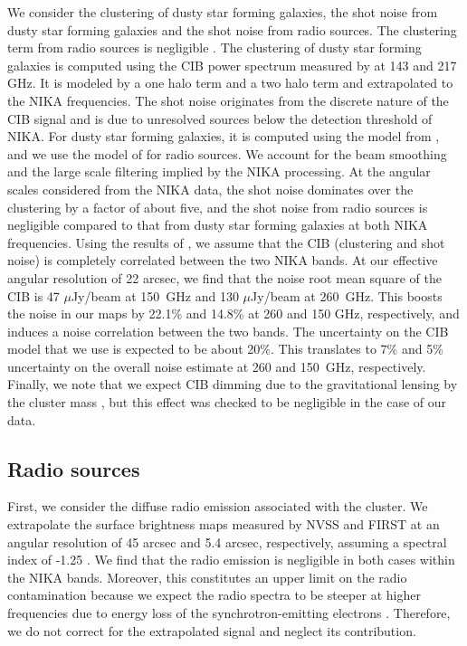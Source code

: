 \documentclass[twocolumn,traditabstract]{aa}
\begin{document}
We consider the clustering of dusty star forming galaxies, the shot noise from dusty star forming galaxies and the shot noise from radio sources. The clustering term from radio sources is negligible \citep{Hall2010}. The clustering of dusty star forming galaxies is computed using the CIB power spectrum measured by \cite{Planck2014XXX} at 143 and 217 GHz. It is modeled by a one halo term and a two halo term and extrapolated to the NIKA frequencies. The shot noise originates from the discrete nature of the CIB signal and is due to unresolved sources below the detection threshold of NIKA. For dusty star forming galaxies, it is computed using the model from \cite{Bethermin2012}, and we use the model of \cite{Tucci2011} for radio sources. We account for the beam smoothing and the large scale filtering implied by the NIKA processing. At the angular scales considered from the NIKA data, the shot noise dominates over the clustering by a factor of about five, and the shot noise from radio sources is negligible compared to that from dusty star forming galaxies at both NIKA frequencies. Using the results of \cite{Bethermin2013}, we assume that the CIB (clustering and shot noise) is completely correlated between the two NIKA bands. At our effective angular resolution of 22 arcsec, we find that the noise root mean square of the CIB is 47 $\mu$Jy/beam at 150~GHz and 130 $\mu$Jy/beam at 260~GHz. This boosts the noise in our maps by 22.1\% and 14.8\% at 260 and 150 GHz, respectively, and induces a noise correlation between the two bands. The uncertainty on the CIB model that we use is expected to be about 20\%. This translates to 7\% and 5\% uncertainty on the overall noise estimate at 260 and 150~GHz, respectively. Finally, we note that we expect CIB dimming due to the gravitational lensing by the cluster mass \citep{Zemcov2013}, but this effect was checked to be negligible in the case of our data.

\subsection{Radio sources}\label{sec:Radio_sources}
First, we consider the diffuse radio emission associated with the cluster. We extrapolate the surface brightness maps measured by NVSS \citep[NRAO VLA Sky Survey,][]{Condon1998} and FIRST \citep[Faint Images of the Radio Sky at Twenty Centimeters,][]{Becker1995} at an angular resolution of 45 arcsec and 5.4 arcsec, respectively, assuming a spectral index of -1.25 \citep{vanWeeren2009,Bonafede2009}. We find that the radio emission is negligible in both cases within the NIKA bands. Moreover, this constitutes an upper limit on the radio contamination because we expect the radio spectra to be steeper at higher frequencies due to energy loss of the synchrotron-emitting electrons \citep{Scheuer1968}. Therefore, we do not correct for the extrapolated signal and neglect its contribution.
\end{document}
